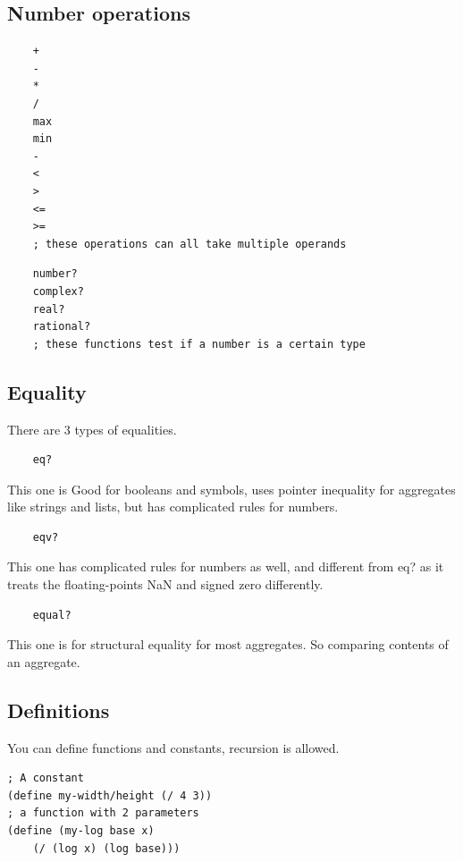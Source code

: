 \documentclass[12pt]{article}
\begin{document}
\subsection{Number operations}

\begin{lstlisting}
    +
    -
    *
    /
    max
    min
    -
    <
    >
    <=
    >=
    ; these operations can all take multiple operands
\end{lstlisting}

\begin{lstlisting}
    number?
    complex?
    real?
    rational?
    ; these functions test if a number is a certain type
\end{lstlisting}

\subsection{Equality}

There are 3 types of equalities.

\begin{lstlisting}
    eq?
\end{lstlisting}
	This one is Good for booleans and symbols, uses pointer inequality for aggregates like strings and lists, but has complicated rules for numbers.
	
\begin{lstlisting}
    eqv?
\end{lstlisting}
	This one has complicated rules for numbers as well, and different from eq? as it treats the floating-points NaN and signed zero differently.
	
	\begin{lstlisting}
    equal?
\end{lstlisting}
This one is for structural equality for most aggregates. So comparing contents of an aggregate.

\subsection{Definitions}

You can define functions and constants, recursion is allowed.

\begin{lstlisting}
; A constant
(define my-width/height (/ 4 3))
; a function with 2 parameters
(define (my-log base x)
	(/ (log x) (log base)))
    
\end{lstlisting}
\end{document}

